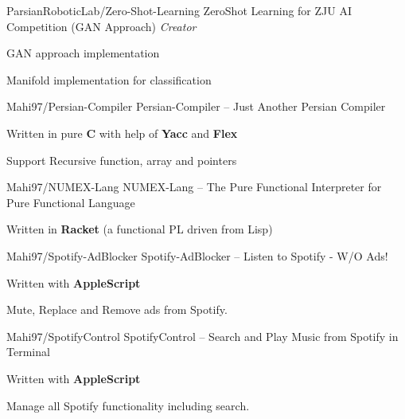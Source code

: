 \begin{cventries}
  \cventry
    {ParsianRoboticLab/Zero-Shot-Learning} %
    {ZeroShot Learning for ZJU AI Competition (GAN Approach)} %
    {\textit{Creator}} %
    {} %
    {
      \begin{cvitems} %
        \item {GAN approach implementation}
        \item {Manifold implementation for classification}
      \end{cvitems}
    }


  \cventry
    {Mahi97/Persian-Compiler} %
    {Persian-Compiler -- Just Another Persian Compiler} %
    {} %
    {} %
    {
      \begin{cvitems} %
        \item {Written in pure \textbf{C} with help of \textbf{Yacc} and \textbf{Flex}}
        \item {Support Recursive function, array and pointers}
      \end{cvitems}
    }

  \cventry
    {Mahi97/NUMEX-Lang} %
    {NUMEX-Lang -- The Pure Functional Interpreter for Pure Functional Language} %
    {} %
    {} %
    {
      \begin{cvitems} %
        \item {Written in \textbf{Racket} (a functional PL driven from Lisp)}
      \end{cvitems}
    }

  \cventry
    {Mahi97/Spotify-AdBlocker} %
    {Spotify-AdBlocker -- Listen to Spotify - W/O Ads!} %
    {} %
    {} %
    {
      \begin{cvitems} %
        \item {Written with \textbf{AppleScript}}
        \item {Mute, Replace and Remove ads from Spotify.}
      \end{cvitems}
    }

  \cventry
    {Mahi97/SpotifyControl} %
    {SpotifyControl -- Search and Play Music from Spotify in Terminal} %
    {} %
    {} %
    {
      \begin{cvitems} %
        \item {Written with \textbf{AppleScript}}
        \item {Manage all Spotify functionality including search.}
      \end{cvitems}
    }
    

\end{cventries}
